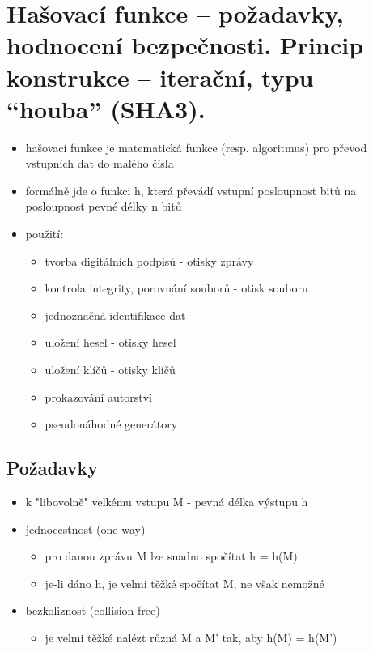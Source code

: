\clearpage
\section{Hašovací funkce -- požadavky, hodnocení bezpečnosti. Princip konstrukce -- iterační, typu \enquote{houba} (SHA3).}
\begin{itemize}
    \item hašovací funkce je matematická funkce (resp. algoritmus) pro převod vstupních dat do malého čísla
    \item formálně jde o funkci h, která převádí vstupní posloupnost bitů na posloupnost pevné délky n bitů
    \item použití:
    \begin{itemize}
        \item tvorba digitálních podpisů - otisky zprávy
        \item kontrola integrity, porovnání souborů - otisk souboru
        \item jednoznačná identifikace dat
        \item uložení hesel - otisky hesel
        \item uložení klíčů - otisky klíčů
        \item prokazování autorství
        \item pseudonáhodné generátory \\
    \end{itemize}
\end{itemize}

\subsection{Požadavky}
\begin{itemize}
    \item k "libovolně" velkému vstupu M - pevná délka výstupu h
    \item jednocestnost (one-way)
    \begin{itemize}
        \item pro danou zprávu M lze snadno spočítat h = h(M)
        \item je-li dáno h, je velmi těžké spočítat M, ne však nemožné
    \end{itemize}
    \item bezkoliznost (collision-free)
    \begin{itemize}
        \item je velmi těžké nalézt různá M a M' tak, aby h(M) = h(M') \\
    \end{itemize}
\end{itemize}

